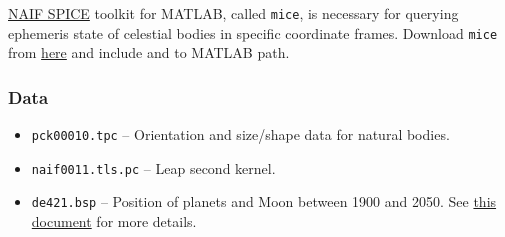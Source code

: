 \documentclass[12pt,letterpaper]{article}
\begin{document}
\href{https://naif.jpl.nasa.gov/naif/toolkit.html}{NAIF SPICE} toolkit for MATLAB, called \texttt{mice}, is necessary for querying ephemeris state of celestial bodies in specific coordinate frames. Download \texttt{mice} from \href{https://naif.jpl.nasa.gov/naif/toolkit_MATLAB.html}{here} and include  and  to MATLAB path.

\subsubsection*{Data}

\begin{itemize}
    \item \texttt{pck00010.tpc} -- Orientation and size/shape data for natural bodies.
    \item \texttt{naif0011.tls.pc} -- Leap second kernel.
    \item  \texttt{de421.bsp} -- Position of planets and Moon between 1900 and 2050. See \href{https://ipnpr.jpl.nasa.gov/progress_report/42-178/178C.pdf}{this document} for more details.
\end{itemize}
\end{document}
